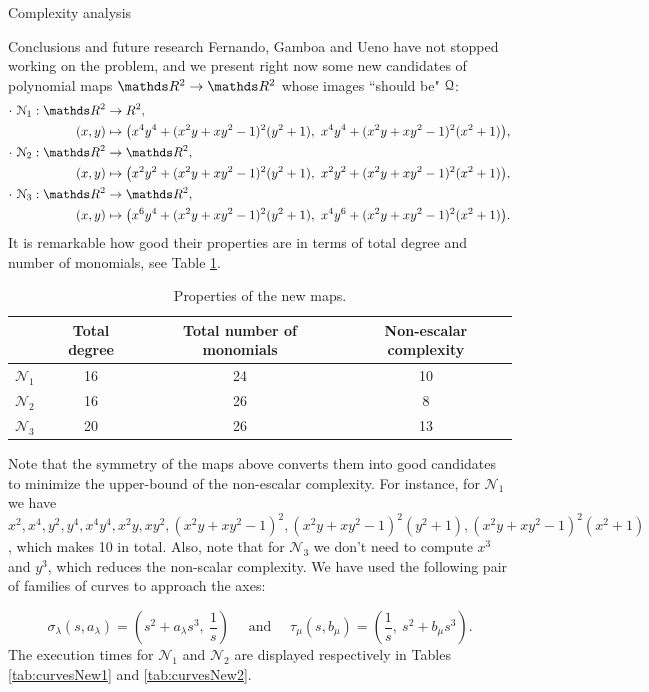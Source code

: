 \documentclass[11pt, a4paper, english, twoside, notitlepage, openright]{report}
\begin{document}
\begin{chapter}{Complexity analysis}
\begin{section}{Conclusions and future research}
Fernando, Gamboa and Ueno have not stopped working on the problem, and we present right now some new candidates of polynomial maps $\R^2\to\R^2$ whose images ``should be" $\mathcal{Q}$:
\begin{align*}
\cdot\ \mathcal{N}_1:\R^2 &\to R^2, \\
(x,y)&\mapsto\big(x^4y^4+(x^2y+xy^2-1)^2(y^2+1),\ x^4y^4+(x^2y+xy^2-1)^2(x^2+1)\big),\\
\cdot\ \mathcal{N}_2:\R^2 &\to \R^2, \\
(x,y)&\mapsto\big(x^2y^2+(x^2y+xy^2-1)^2(y^2+1),\ x^2y^2+(x^2y+xy^2-1)^2(x^2+1)\big),\\
\cdot\ \mathcal{N}_3:\R^2 &\to \R^2, \\
(x,y)&\mapsto\big(x^6y^4+(x^2y+xy^2-1)^2(y^2+1),\ x^4y^6+(x^2y+xy^2-1)^2(x^2+1)\big).
\end{align*}
It is remarkable how good their properties are in terms of total degree and number of monomials, see Table \ref{tab:newDegreeMon}.

\begin{table}[ht!]
\begin{center}
\begin{tabular}{c || c | c | c}
& Total degree & Total number of monomials & Non-escalar complexity\\ \hline \hline
$\mathcal{N}_1$&16&24&10 \\ \hline
$\mathcal{N}_2$&16&26&8 \\ \hline
$\mathcal{N}_3$&20&26&13 \\	
\end{tabular}
\caption{Properties of the new maps.}\label{tab:newDegreeMon}
\end{center}
\end{table}
Note that the symmetry of the maps above converts them into good candidates to minimize the upper-bound of the non-escalar complexity. For instance, for $\mathcal{N}_1$ we have $x^2, x^4, y^2, y^4, x^4y^4, x^2y, xy^2, (x^2y+xy^2-1)^2, (x^2y+xy^2-1)^2(y^2+1), (x^2y+xy^2-1)^2(x^2+1)$, which makes 10 in total. Also, note that for $\mathcal{N}_3$ we don't need to compute $x^3$ and $y^3$, which reduces the non-scalar complexity. We have used the following pair of families of curves to approach the axes:

$$
\sigma_\lambda(s, a_\lambda) = \left(s^2 + a_\lambda s^3,\ \frac{1}{s}\right)
\quad \text{ and } \quad
\tau_\mu(s, b_\mu) = \left(\frac{1}{s},\ s^2 + b_\mu s^3\right).
$$
The execution times for $\mathcal{N}_1$ and $\mathcal{N}_2$ are displayed respectively in Tables \ref{tab:curvesNew1} and \ref{tab:curvesNew2}.


\end{section}
\end{chapter}
\end{document}
